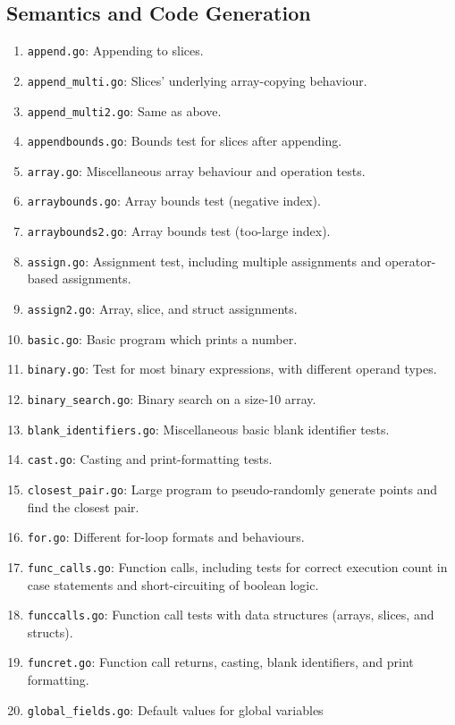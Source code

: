 \documentclass[11pt]{article}
\begin{document}
\subsection{Semantics and Code Generation}

\begin{enumerate}
\item \texttt{append.go}: Appending to slices.
\item \texttt{append\_multi.go}: Slices' underlying array-copying
  behaviour.
\item \texttt{append\_multi2.go}: Same as above.
\item \texttt{appendbounds.go}: Bounds test for slices after
  appending.
\item \texttt{array.go}: Miscellaneous array behaviour and operation
  tests.
\item \texttt{arraybounds.go}: Array bounds test (negative index).
\item \texttt{arraybounds2.go}: Array bounds test (too-large index).
\item \texttt{assign.go}: Assignment test, including multiple
  assignments and operator-based assignments.
\item \texttt{assign2.go}: Array, slice, and struct assignments.
\item \texttt{basic.go}: Basic program which prints a number.
\item \texttt{binary.go}: Test for most binary expressions, with
  different operand types.
\item \texttt{binary\_search.go}: Binary search on a size-10 array.
\item \texttt{blank\_identifiers.go}: Miscellaneous basic blank
  identifier tests.
\item \texttt{cast.go}: Casting and print-formatting tests.
\item \texttt{closest\_pair.go}: Large program to pseudo-randomly
  generate points and find the closest pair.
\item \texttt{for.go}: Different for-loop formats and behaviours.
\item \texttt{func\_calls.go}: Function calls, including tests for
  correct execution count in case statements and short-circuiting of
  boolean logic.
\item \texttt{funccalls.go}: Function call tests with data structures
  (arrays, slices, and structs).
\item \texttt{funcret.go}: Function call returns, casting, blank
  identifiers, and print formatting.
\item \texttt{global\_fields.go}: Default values for global variables

\end{enumerate}
\end{document}
